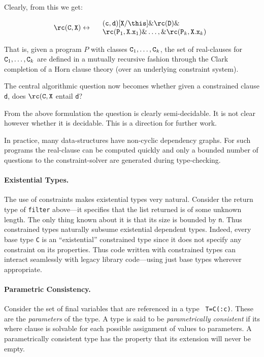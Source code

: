 \noindent Clearly, from this we get:

$$\rc({\tt C},{\tt X}) \leftrightarrow 
\begin{array}{l}
\quad ({\tt c},{\tt d})[{\tt X}/\this] \&   \rc({\tt D}) \& \\
\quad \rc({\tt P}_1, {\tt X.x}_1)\& \ldots, \& \rc({\tt P}_k, {\tt X.x}_k)
\end{array}
$$
  
That is, given a program $P$ with classes ${\tt C}_1,\ldots, {\tt
C}_k$, the set of real-clauses for ${\tt C}_1,\ldots, {\tt C}_k$ are
defined in a mutually recursive fashion through the Clark completion
of a Horn clause theory (over an underlying constraint system).

The central algorithmic question now becomes whether given a
constrained clause {\tt d}, does $\rc({\tt C},{\tt X}$ entail {\tt d}? 

From the above formulation the question is clearly semi-decidable. It
is not clear however whether it is decidable. This is a direction for
further work.

In practice, many data-structures have non-cyclic dependency
graphs. For such programs the real-clause can be computed quickly and
only a bounded number of questions to the constraint-solver are
generated during type-checking.

\paragraph{Existential Types.}
The use of constraints makes existential types very natural.  Consider
the return type of {\tt filter} above---it specifies that the list
returned is of some unknown length. The only thing known about it is
that its size is bounded by {\tt n}. Thus constrained types naturally
subsume existential dependent types. Indeed, every base type {\tt C}
is an ``existential'' constrained type since it does not specify any
constraint on its properties. Thus code written with constrained types
can interact seamlessly with legacy library code---using just base
types wherever appropriate.

\paragraph{Parametric Consistency.}
Consider the set of final variables that are referenced in a type {\tt
T=C(:c)}. These are the {\em parameters} of the type. A type is said
to be {\em parametrically consistent} if its where clause is solvable
for each possible assignment of values to parameters.  A
parametrically consistent type has the property that its extension
will never be empty. 

